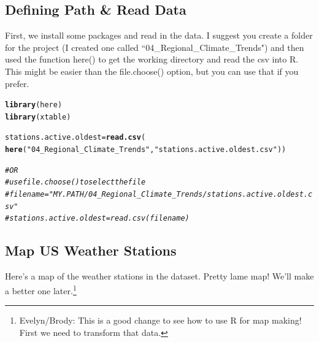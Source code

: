 \documentclass{article}\usepackage[]{graphicx}\usepackage[]{xcolor}
\makeatletter
\newcommand{\hlstr}[1]{\textcolor[rgb]{0.192,0.494,0.8}{#1}}%
\newcommand{\hlcom}[1]{\textcolor[rgb]{0.678,0.584,0.686}{\textit{#1}}}%
\newcommand{\hlstd}[1]{\textcolor[rgb]{0.345,0.345,0.345}{#1}}%
\newcommand{\hlkwb}[1]{\textcolor[rgb]{0.69,0.353,0.396}{#1}}%
\newcommand{\hlkwd}[1]{\textcolor[rgb]{0.737,0.353,0.396}{\textbf{#1}}}%
\newenvironment{kframe}{%
 \def\at@end@of@kframe{}%
 \ifinner\ifhmode%
  \def\at@end@of@kframe{\end{minipage}}%
  \begin{minipage}{\columnwidth}%
 \fi\fi%
 \def\FrameCommand##1{\hskip\@totalleftmargin \hskip-\fboxsep
 \colorbox{shadecolor}{##1}\hskip-\fboxsep
     \hskip-\linewidth \hskip-\@totalleftmargin \hskip\columnwidth}%
 \MakeFramed {\advance\hsize-\width
   \@totalleftmargin\z@ \linewidth\hsize
   \@setminipage}}%
 {\par\unskip\endMakeFramed%
 \at@end@of@kframe}
\newenvironment{knitrout}{}{} %
\makeatother
\begin{document}
\subsection{Defining Path \& Read Data}

First, we install some packages and read in the data. I suggest you create a folder for the project (I created one called ``04\_Regional\_Climate\_Trends") and then used the function here() to get the working directory and read the csv into R. This might be easier than the file.choose() option, but you can use that if you prefer.

\begin{knitrout}
\color{fgcolor}\begin{kframe}
\begin{alltt}
\hlkwd{library}\hlstd{(here)}
\hlkwd{library}\hlstd{(xtable)}

\hlstd{stations.active.oldest} \hlkwb{=} \hlkwd{read.csv}\hlstd{(}
  \hlkwd{here}\hlstd{(}\hlstr{"04_Regional_Climate_Trends"}\hlstd{,} \hlstr{"stations.active.oldest.csv"}\hlstd{))}

\hlcom{# OR}
\hlcom{# use file.choose() to select the file}
\hlcom{# filename = "MY.PATH/04_Regional_Climate_Trends/stations.active.oldest.csv"}
\hlcom{# stations.active.oldest = read.csv(filename)}
\end{alltt}
\end{kframe}
\end{knitrout}


\subsection{Map US Weather Stations}

Here's a map of the weather stations in the dataset. Pretty lame map!  We'll make a better one later.\footnote{Evelyn/Brody: This is a good change to see how to use R for map making! First we need to transform that data.}
\end{document}
